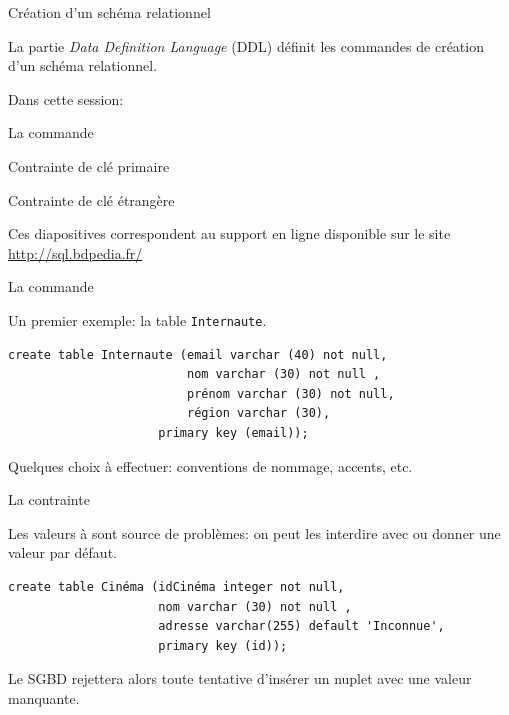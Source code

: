 
\begin{frame}[fragile]{Création d'un schéma relationnel}

La partie \textit{Data Definition Language} (DDL) définit
les commandes de création d'un schéma relationnel.

\vfill

Dans cette session:

\begin{redbullet}
  \item La commande 
  \item Contrainte de clé primaire 
  \item Contrainte de clé étrangère 
\end{redbullet}

\vfill
\begin{blocgauche}
\alert{Ces diapositives correspondent au support en ligne disponible sur
le site \url{http://sql.bdpedia.fr/}}
\end{blocgauche}

\end{frame}

\begin{frame}[fragile]{La commande }

Un premier exemple: la table \texttt{Internaute}.

\vfill

\begin{verbatim}
create table Internaute (email varchar (40) not null, 
                         nom varchar (30) not null ,
                         prénom varchar (30) not null,
                         région varchar (30),
                     primary key (email));
\end{verbatim}

\vfill
\begin{blocgauche}
Quelques choix à effectuer: conventions de nommage, accents, etc.
\end{blocgauche}
\end{frame}


\begin{frame}[fragile]{La contrainte }

Les valeurs à  sont source de problèmes: on peut les interdire
avec  ou donner une valeur par défaut.

\vfill

\begin{verbatim}
create table Cinéma (idCinéma integer not null,
                     nom varchar (30) not null ,
                     adresse varchar(255) default 'Inconnue',
                     primary key (id));
\end{verbatim}

\vfill
\begin{blocgauche}
Le SGBD rejettera alors toute tentative d’insérer un nuplet avec une valeur manquante.
\end{blocgauche}
\end{frame}

